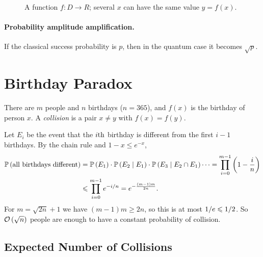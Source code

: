 \begin{figure}[ht]
    \centering
    \caption{A function $f \colon D \to R$; several $x$ can have the same value $y = f(x)$.}
    \label{fig:search-0903}
\end{figure}

\paragraph{Probability amplitude amplification.} If the classical success probability is $p$, then
in the quantum case it becomes $\sqrt{p}$.

\section{Birthday Paradox}

There are $m$ people and $n$ birthdays ($n = 365$), and $f(x)$ is the birthday of person $x$. A
\emph{collision} is a pair $x \neq y$ with $f(x) = f(y)$.

Let $E_i$ be the event that the $i\text{th}$ birthday is different from the first $i-1$ birthdays.
By the chain rule and $1 - x \leq e^{-x}$,
\begin{align*}
    \operatorname{\mathbb{P}}\left(\text{all birthdays different}\right)
     & = \operatorname{\mathbb{P}}\left(E_1\right) \cdot \operatorname{\mathbb{P}}\left(E_2 \mid E_1\right) \cdot \operatorname{\mathbb{P}}\left(E_3 \mid E_2 \cap E_1\right) \cdots
    = \prod_{i=0}^{m-1} \left(1 - \frac{i}{n}\right)                                        \\
     & \leqslant \prod_{i=0}^{m-1} e^{-i/n}
    = e^{-\frac{(m-1)m}{2n}}.
\end{align*}
For $m = \sqrt{2n} + 1$ we have $(m-1)m \geq 2n$, so this is at most $1/e \leqslant 1/2$.
So $\mathcal{O}\left(\sqrt{n}\right)$ people are enough to have a constant probability of collision.

\subsection{Expected Number of Collisions}

